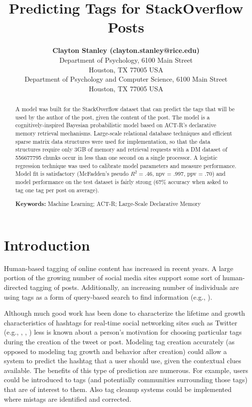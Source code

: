 \documentclass[10pt,letterpaper]{article}
\title{Predicting Tags for StackOverflow Posts}
\author{{\large \bf Clayton Stanley (clayton.stanley@rice.edu)} \\
  Department of Psychology, 6100 Main Street \\
  Houston, TX 77005 USA 
  \AND {\large \bf Mike Byrne (byrne@rice.edu)} \\
  Department of Psychology and Computer Science, 6100 Main Street \\
  Houston, TX 77005 USA }
\begin{document}
\maketitle

\begin{abstract}
  A model was built for the StackOverflow dataset that can predict the tags that will be used by the author of the post, given the content of the post.
  The model is a cognitively-inspired Bayesian probabilistic model based on ACT-R's declarative memory retrieval mechanisms.
  Large-scale relational database techniques and efficient sparse matrix data structures were used for implementation,
  so that the data structures require only 3GB of memory and retrieval requests with a DM dataset of \num{556677795} chunks occur in less than one second on a single processor.
  A logistic regression technique was used to calibrate model parameters and measure performance.
  Model fit is satisfactory (McFadden's pseudo $R_{}^{2}=.46$, npv = .997, ppv = .70) and model performance on the test dataset is fairly strong (67\% accuracy when asked to tag one tag per post on average).

  \textbf{Keywords:} 
  Machine Learning; ACT-R; Large-Scale Declarative Memory
\end{abstract}

\section{Introduction}

Human-based tagging of online content has increased in recent years.
A large portion of the growing number of social media sites support some sort of human-directed tagging of posts.
Additionally, an increasing number of individuals are using tags as a form of query-based search to find information
(e.g., ).

Although much good work has been done to characterize the lifetime and growth characteristics of hashtags for real-time social networking sites such as Twitter
(e.g., , , )
less is known about a person's motivation for choosing particular tags during the creation of the tweet or post.
Modeling tag creation accurately (as opposed to modeling tag growth and behavior after creation) could allow a system to predict the hashtag that a user should use, given the contextual clues available.
The benefits of this type of prediction are numerous.
For example, users could be introduced to tags (and potentially communities surrounding those tags) that are of interest to them.
Also tag cleanup systems could be implemented where mistags are identified and corrected.
\end{document}
